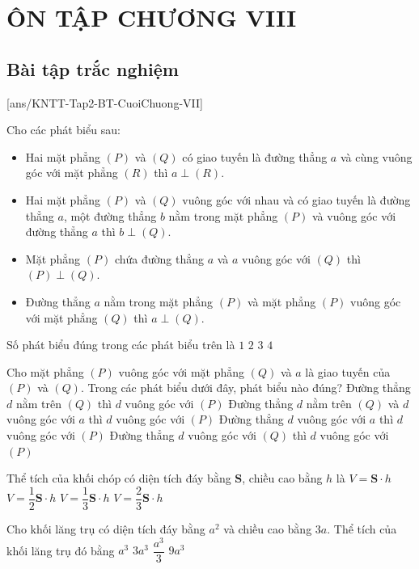 \section*{ÔN TẬP CHƯƠNG VIII}
\subsection{Bài tập trắc nghiệm}
[ans/KNTT-Tap2-BT-CuoiChuong-VII]
\begin{ex}%
	Cho các phát biểu sau:
	\begin{itemize}
	\item Hai mặt phẳng $(P)$ và $(Q)$ có giao tuyến là đường thẳng $a$ và cùng vuông góc với mặt phẳng $(R)$ thì $a\perp(R)$.
	\item Hai mặt phẳng $(P)$ và $(Q)$ vuông góc với nhau và có giao tuyến là đường thẳng $a$, một đường thẳng $b$ nằm trong mặt phẳng $(P)$ và vuông góc với đường thẳng $a$ thì $b\perp(Q)$.
	\item Mặt phẳng $(P)$ chứa đường thẳng $a$ và $a$ vuông góc với $(Q)$ thì $(P)\perp(Q)$.
	\item Đường thẳng $a$ nằm trong mặt phẳng $(P)$ và mặt phẳng $(P)$ vuông góc với mặt phẳng $(Q)$ thì $a\perp(Q)$.
	\end{itemize}
	Số phát biểu đúng trong các phát biểu trên là
	\choice
	{$1$}
	{$2$}
	{\True $3$}
	{$4$} 
\end{ex}
\begin{ex}%
	Cho mặt phẳng $(P)$ vuông góc với mặt phẳng $(Q)$ và $a$ là giao tuyến của $(P)$ và $(Q)$. Trong các phát biểu dưới đây, phát biểu nào đúng?
	\choice
	{Đường thẳng $d$ nằm trên $(Q)$ thì $d$ vuông góc với $(P)$}
	{\True Đường thẳng $d$ nằm trên $(Q)$ và $d$ vuông góc với $a$ thì $d$ vuông góc với $(P)$}
	{Đường thẳng $d$ vuông góc với $a$ thì $d$ vuông góc với $(P)$}
	{Đường thẳng $d$ vuông góc với $(Q)$ thì $d$ vuông góc với $(P)$}
	\loigiai{}
\end{ex}
\begin{ex}%
	Thể tích của khối chóp có diện tích đáy bằng $\mathbf{S}$, chiều cao bằng $h$ là
	\choice
	{$V=\mathbf{S}\cdot h$}
	{$V=\dfrac{1}{2}\mathbf{S}\cdot h$}
	{\True $V=\dfrac{1}{3}\mathbf{S}\cdot h$}
	{$V=\dfrac{2}{3}\mathbf{S}\cdot h$}
	\loigiai{}
\end{ex}
\begin{ex}%
	Cho khối lăng trụ có diện tích đáy bằng $a^2$ và chiều cao bằng $3a$. Thể tích của khối lăng trụ đó bằng
	\choice
	{$a^3$}
	{\True $3a^3$}
	{$\dfrac{a^3}{3}$}
	{$9a^3$}
\end{ex}
